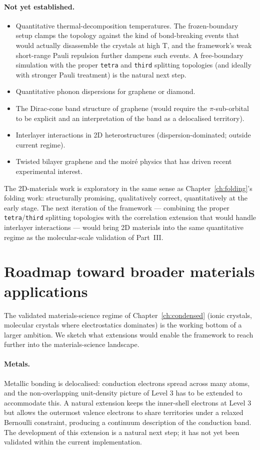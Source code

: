 \paragraph{Not yet established.}
\begin{itemize}
\item Quantitative thermal-decomposition temperatures. The frozen-boundary setup clamps the topology against the kind of bond-breaking events that would actually disassemble the crystals at high T, and the framework's weak short-range Pauli repulsion further dampens such events. A free-boundary simulation with the proper \texttt{tetra} and \texttt{third} splitting topologies (and ideally with stronger Pauli treatment) is the natural next step.
\item Quantitative phonon dispersions for graphene or diamond.
\item The Dirac-cone band structure of graphene (would require the $\pi$-sub-orbital to be explicit and an interpretation of the band as a delocalised territory).
\item Interlayer interactions in 2D heterostructures (dispersion-dominated; outside current regime).
\item Twisted bilayer graphene and the moir\'e physics that has driven recent experimental interest.
\end{itemize}

The 2D-materials work is exploratory in the same sense as Chapter~\ref{ch:folding}'s folding work: structurally promising, qualitatively correct, quantitatively at the early stage. The next iteration of the framework --- combining the proper \texttt{tetra}/\texttt{third} splitting topologies with the correlation extension that would handle interlayer interactions --- would bring 2D materials into the same quantitative regime as the molecular-scale validation of Part~III.

\section{Roadmap toward broader materials applications}\label{sec:material-roadmap}

The validated materials-science regime of Chapter~\ref{ch:condensed} (ionic crystals, molecular crystals where electrostatics dominates) is the working bottom of a larger ambition. We sketch what extensions would enable the framework to reach further into the materials-science landscape.

\paragraph{Metals.}
Metallic bonding is delocalised: conduction electrons spread across many atoms, and the non-overlapping unit-density picture of Level 3 has to be extended to accommodate this. A natural extension keeps the inner-shell electrons at Level 3 but allows the outermost valence electrons to share territories under a relaxed Bernoulli constraint, producing a continuum description of the conduction band. The development of this extension is a natural next step; it has not yet been validated within the current implementation.

